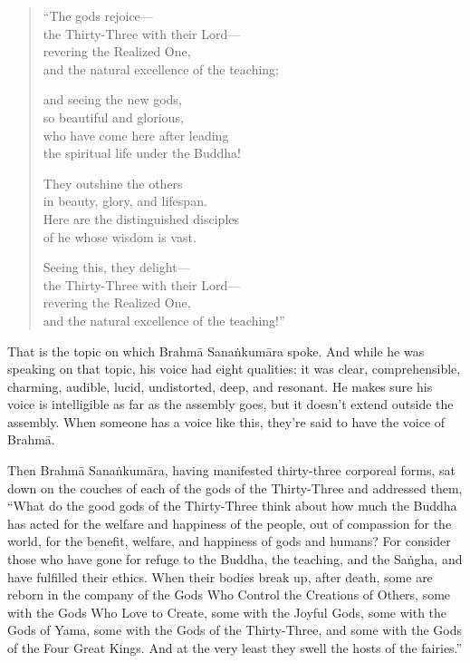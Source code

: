 \documentclass[12pt,openany]{book}%
\begin{document}
\begin{verse}%
“The gods rejoice—\\
the Thirty-Three with their Lord—\\
revering the Realized One, \\
and the natural excellence of the teaching; 

and seeing the new gods, \\
so beautiful and glorious, \\
who have come here after leading \\
the spiritual life under the Buddha! 

They outshine the others \\
in beauty, glory, and lifespan. \\
Here are the distinguished disciples \\
of he whose wisdom is vast. 

Seeing this, they delight—\\
the Thirty-Three with their Lord—\\
revering the Realized One, \\
and the natural excellence of the teaching!” 

%
\end{verse}

That is the topic on which \textsanskrit{Brahmā} \textsanskrit{Sanaṅkumāra} spoke. And while he was speaking on that topic, his voice had eight qualities: it was clear, comprehensible, charming, audible, lucid, undistorted, deep, and resonant. He makes sure his voice is intelligible as far as the assembly goes, but it doesn’t extend outside the assembly. When someone has a voice like this, they’re said to have the voice of \textsanskrit{Brahmā}. 

Then \textsanskrit{Brahmā} \textsanskrit{Sanaṅkumāra}, having manifested thirty-three corporeal forms, sat down on the couches of each of the gods of the Thirty-Three and addressed them, “What do the good gods of the Thirty-Three think about how much the Buddha has acted for the welfare and happiness of the people, out of compassion for the world, for the benefit, welfare, and happiness of gods and humans? For consider those who have gone for refuge to the Buddha, the teaching, and the \textsanskrit{Saṅgha}, and have fulfilled their ethics. When their bodies break up, after death, some are reborn in the company of the Gods Who Control the Creations of Others, some with the Gods Who Love to Create, some with the Joyful Gods, some with the Gods of Yama, some with the Gods of the Thirty-Three, and some with the Gods of the Four Great Kings. And at the very least they swell the hosts of the fairies.” 
\end{document}
